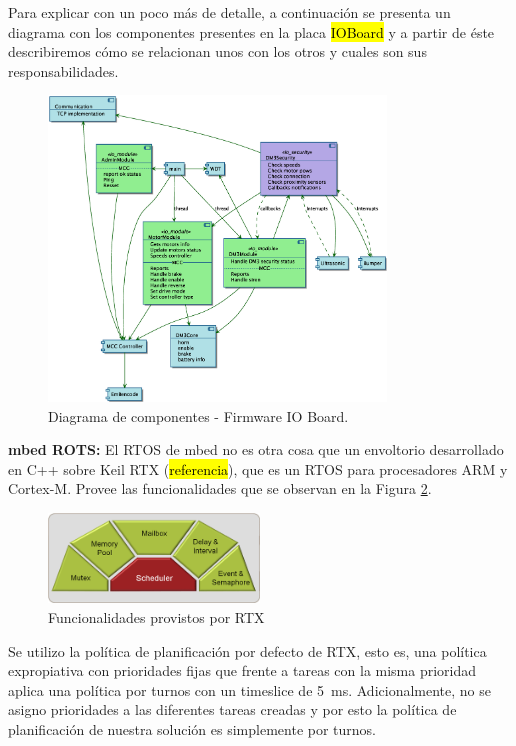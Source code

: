 \documentclass[withindex,glossary]{cam-thesis}
\begin{document}
Para explicar con un poco más de detalle, a continuación se presenta un diagrama con los componentes presentes en la placa \hl{IOBoard} y a partir de éste describiremos cómo se relacionan unos con los otros y cuales son sus responsabilidades.

\begin{figure}[H]
\centering
\includegraphics[width=0.8\textwidth]{images/DM3_IOBoard_Components}
\caption[Diagrama de componentes IO Board]{Diagrama de componentes - Firmware IO Board.}
\label{fig: Diagrama de componentes - Firmware IO Board}
\end{figure}

\textbf{mbed ROTS:} El RTOS de mbed no es otra cosa que un envoltorio desarrollado en C++ sobre Keil RTX (\hl{referencia}), que es un RTOS para procesadores ARM y Cortex-M. Provee las funcionalidades que se observan en la Figura \ref{fig: RTX}.

\begin{figure}[H]
  \centering
  \includegraphics[width=0.5\textwidth]{images/rtx}
  \caption[RTOS - Funcionalidades provistos por RTX]{Funcionalidades provistos por RTX}
  \label{fig: RTX}
\end{figure}

Se utilizo la política de planificación por defecto de RTX, esto es, una política expropiativa con prioridades fijas que frente a tareas con la misma prioridad aplica una política por turnos con un timeslice de \SI{5}{\milli\second}. Adicionalmente, no se asigno prioridades a las diferentes tareas creadas y por esto la política de planificación de nuestra solución es simplemente por turnos.
\end{document}
